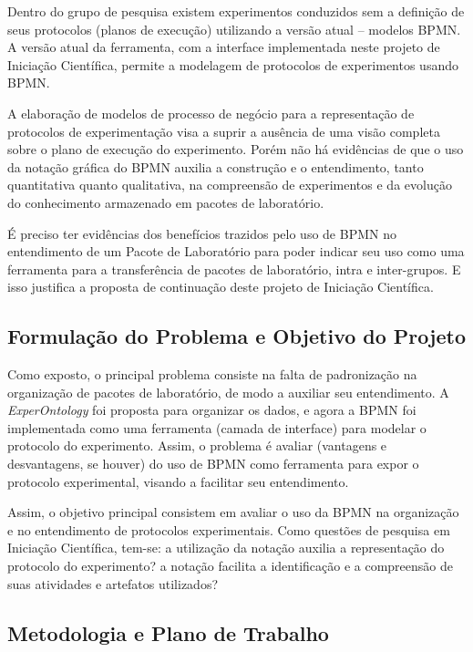 Dentro do grupo de pesquisa existem experimentos conduzidos sem a definição de seus protocolos (planos de execução) utilizando a versão atual -- modelos BPMN. 
A versão atual da ferramenta, com a interface implementada neste projeto de Iniciação Científica, permite a modelagem de protocolos de experimentos usando BPMN. 

A elaboração de modelos de processo de negócio para a representação de protocolos de experimentação visa a suprir a ausência de uma visão completa sobre o plano de execução do experimento. Porém não há evidências de que o uso da notação gráfica do BPMN auxilia a construção e o entendimento, tanto quantitativa quanto qualitativa, na compreensão de experimentos e da evolução do conhecimento armazenado em pacotes de laboratório.

É preciso ter evidências dos benefícios trazidos pelo uso de BPMN no entendimento de um Pacote de Laboratório para poder indicar seu uso como uma ferramenta para a transferência de pacotes de laboratório, intra e inter-grupos. E isso justifica a proposta de continuação deste projeto de Iniciação Científica. 


\subsection{Formulação do Problema e Objetivo do Projeto}\label{cap:objetivos}

Como exposto, o principal problema consiste na falta de padronização na organização de pacotes de laboratório, de modo a auxiliar seu entendimento. A \textit{ExperOntology} foi proposta para organizar os dados, e agora a BPMN foi implementada como uma ferramenta (camada de interface) para modelar o protocolo do experimento. Assim, o problema é avaliar (vantagens e desvantagens, se houver) do uso de BPMN como ferramenta para expor o protocolo experimental, visando a facilitar seu entendimento. 

Assim, o objetivo principal consistem em avaliar o uso da BPMN na organização e no entendimento de protocolos experimentais. Como questões de pesquisa em Iniciação Científica, tem-se: a utilização da notação auxilia a representação do protocolo do experimento? a notação facilita a identificação e a compreensão de suas atividades e artefatos utilizados?

\subsection{Metodologia e Plano de Trabalho}

